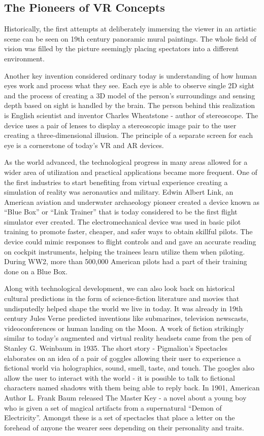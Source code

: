 \documentclass[12pt, a4paper]{article}
\begin{document}
\subsection{The Pioneers of VR Concepts}
Historically, the first attempts at deliberately immersing the viewer in an artistic scene can be seen on 19th century panoramic mural paintings. The whole field of vision was filled by the picture seemingly placing spectators into a different environment.

Another key invention considered ordinary today is understanding of how human eyes work and process what they see. Each eye is able to observe single 2D sight and the process of creating a 3D model of the person’s surroundings and sensing depth based on sight is handled by the brain. The person behind this realization is English scientist and inventor Charles Wheatstone - author of stereoscope. The device uses a pair of lenses to display a stereoscopic image pair to the user creating a three-dimensional illusion. The principle of a separate screen for each eye is a cornerstone of today’s VR and AR devices.

As the world advanced, the technological progress in many areas allowed for a wider area of utilization and practical applications became more frequent. One of the first industries to start benefiting from virtual experience creating a simulation of reality was aeronautics and military. Edwin Albert Link, an American aviation and underwater archaeology pioneer created a device known as “Blue Box” or “Link Trainer” that is today considered to be the first flight simulator ever created. The electromechanical device was used in basic pilot training to promote faster, cheaper, and safer ways to obtain skillful pilots. The device could mimic responses to flight controls and and gave an accurate reading on cockpit instruments, helping the trainees learn utilize them when piloting. During WW2, more than 500,000 American  pilots had a part of their training done on a Blue Box.

Along with technological development, we can also look back on historical cultural predictions in the form of science-fiction literature and movies that undisputedly helped shape the world we live in today. It was already in 19th century Jules Verne predicted inventions like submarines, television newscasts, videoconferences or human landing on the Moon. A work of fiction strikingly similar to today’s augmented and virtual reality headsets came from the pen of  Stanley G. Weinbaum in 1935. The short story - Pigmalion’s Spectacles elaborates on an idea of a pair of goggles allowing their user to experience a fictional world via holographics, sound, smell, taste, and touch. The googles also allow the user to interact with the world - it is possible to talk to fictional characters named shadows with them being able to reply back. In 1901, American Author L. Frank Baum released The Master Key - a novel about a young boy who is given a set of magical artifacts from a supernatural “Demon of Electricity”. Amongst these is a set of spectacles that place a letter on the forehead of anyone the wearer sees depending on their personality and traits.
\end{document}
